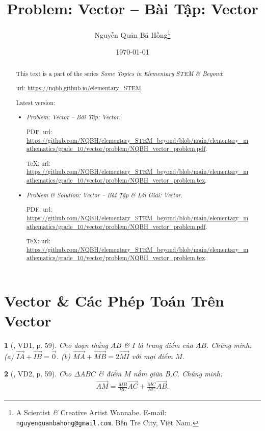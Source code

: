 \documentclass{article}
\title{Problem: Vector -- Bài Tập: Vector}
\author{Nguyễn Quản Bá Hồng\footnote{A Scientist {\it\&} Creative Artist Wannabe. E-mail: {\tt nguyenquanbahong@gmail.com}. Bến Tre City, Việt Nam.}}
\date{\today}
\newtheorem{baitoan}{}
\begin{document}
\maketitle
\begin{abstract}
	This text is a part of the series {\it Some Topics in Elementary STEM \& Beyond}:
	
	{\sc url}: \url{https://nqbh.github.io/elementary_STEM}.
	
	Latest version:
	\begin{itemize}
		\item {\it Problem: Vector -- Bài Tập: Vector}.
		
		PDF: {\sc url}: \url{https://github.com/NQBH/elementary_STEM_beyond/blob/main/elementary_mathematics/grade_10/vector/problem/NQBH_vector_problem.pdf}.
		
		\TeX: {\sc url}: \url{https://github.com/NQBH/elementary_STEM_beyond/blob/main/elementary_mathematics/grade_10/vector/problem/NQBH_vector_problem.tex}.
		\item {\it Problem \& Solution: Vector -- Bài Tập \& Lời Giải: Vector}.
		
		PDF: {\sc url}: \url{https://github.com/NQBH/elementary_STEM_beyond/blob/main/elementary_mathematics/grade_10/vector/problem/NQBH_vector_problem.pdf}.
		
		\TeX: {\sc url}: \url{https://github.com/NQBH/elementary_STEM_beyond/blob/main/elementary_mathematics/grade_10/vector/problem/NQBH_vector_problem.tex}.
	\end{itemize}
\end{abstract}
\tableofcontents


\section{Vector \& Các Phép Toán Trên Vector}

\begin{baitoan}[\cite{Hai_Hung_Thu_Tung2022_tap_1}, VD1, p. 59]
	Cho đoạn thẳng $AB$ \& $I$ là trung điểm của $AB$. Chứng minh: (a) $\overrightarrow{IA} + \overrightarrow{IB} = \vec{0}$. (b)  $\overrightarrow{MA} + \overrightarrow{MB} = 2\overrightarrow{MI}$ với mọi điểm $M$.
\end{baitoan}

\begin{baitoan}[\cite{Hai_Hung_Thu_Tung2022_tap_1}, VD2, p. 59]
	Cho $\Delta ABC$ \& điểm $M$ nằm giữa B,C. Chứng minh:
	\begin{align*}
		\overrightarrow{AM} = \frac{MB}{BC}\overrightarrow{AC} + \frac{MC}{BC}\overrightarrow{AB}.
	\end{align*}
\end{baitoan}
\end{document}
